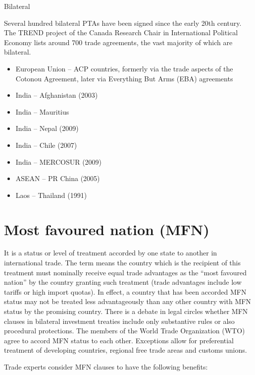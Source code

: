 \documentclass[
  openany]{book}
\providecommand{\tightlist}{%
  \setlength{\itemsep}{0pt}\setlength{\parskip}{0pt}}
\begin{document}
Bilateral

Several hundred bilateral PTAs have been signed since the early 20th century. The TREND project of the Canada Research Chair in International Political Economy lists around 700 trade agreements, the vast majority of which are bilateral.

\begin{itemize}
\tightlist
\item
  European Union -- ACP countries, formerly via the trade aspects of the Cotonou Agreement, later via Everything But Arms (EBA) agreements
\item
  India -- Afghanistan (2003)
\item
  India -- Mauritius
\item
  India -- Nepal (2009)
\item
  India -- Chile (2007)
\item
  India -- MERCOSUR (2009)
\item
  ASEAN -- PR China (2005)
\item
  Laos -- Thailand (1991)
\end{itemize}

\hypertarget{most-favoured-nation-mfn}{%
\section{Most favoured nation (MFN)}\label{most-favoured-nation-mfn}}

It is a status or level of treatment accorded by one state to another in international trade. The term means the country which is the recipient of this treatment must nominally receive equal trade advantages as the ``most favoured nation'' by the country granting such treatment (trade advantages include low tariffs or high import quotas). In effect, a country that has been accorded MFN status may not be treated less advantageously than any other country with MFN status by the promising country. There is a debate in legal circles whether MFN clauses in bilateral investment treaties include only substantive rules or also procedural protections. The members of the World Trade Organization (WTO) agree to accord MFN status to each other. Exceptions allow for preferential treatment of developing countries, regional free trade areas and customs unions.

Trade experts consider MFN clauses to have the following benefits:
\end{document}
